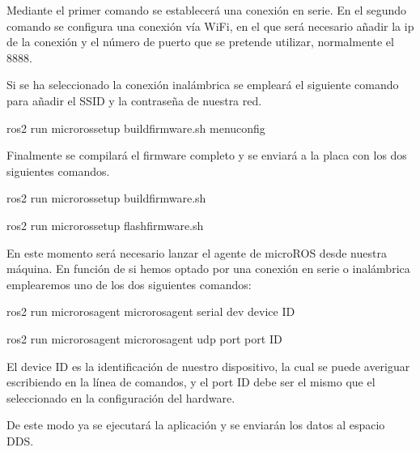 \documentclass[a4paper,11pt,spanish]{sphinxmanual}
\begin{document}
\sphinxAtStartPar
Mediante el primer comando se establecerá una conexión en serie. En el segundo
comando se configura una conexión vía Wi\sphinxhyphen{}Fi, en el que será necesario añadir
la ip de la conexión y el número de puerto que se pretende utilizar, normalmente
el 8888.

\sphinxAtStartPar
Si se ha seleccionado la conexión inalámbrica se empleará el siguiente comando
para añadir el SSID y la contraseña de nuestra red.

\begin{sphinxVerbatim}[commandchars=\\\{\},formatcom=\footnotesize]
ros2 run micro\PYGZus{}ros\PYGZus{}setup build\PYGZus{}firmware.sh menuconfig
\end{sphinxVerbatim}

\sphinxAtStartPar
Finalmente se compilará el firmware completo y se enviará a la placa con los
dos siguientes comandos.

\begin{sphinxVerbatim}[commandchars=\\\{\},formatcom=\footnotesize]
ros2 run micro\PYGZus{}ros\PYGZus{}setup build\PYGZus{}firmware.sh

ros2 run micro\PYGZus{}ros\PYGZus{}setup flash\PYGZus{}firmware.sh
\end{sphinxVerbatim}

\sphinxAtStartPar
En este momento será necesario lanzar el agente de micro\sphinxhyphen{}ROS desde
nuestra máquina. En función de si hemos optado por una conexión en serie
o inalámbrica emplearemos uno de los dos siguientes comandos:

\begin{sphinxVerbatim}[commandchars=\\\{\},formatcom=\footnotesize]
ros2 run micro\PYGZus{}ros\PYGZus{}agent micro\PYGZus{}ros\PYGZus{}agent serial \PYGZhy{}\PYGZhy{}dev \PYG{o}{[}device ID\PYG{o}{]}

ros2 run micro\PYGZus{}ros\PYGZus{}agent micro\PYGZus{}ros\PYGZus{}agent udp \PYGZhy{}\PYGZhy{}port \PYG{o}{[}port ID\PYG{o}{]}
\end{sphinxVerbatim}

\sphinxAtStartPar
El device ID es la identificación de nuestro dispositivo, la cual
se puede averiguar escribiendo  en la línea de
comandos, y el port ID debe ser el mismo que el seleccionado en
la configuración del hardware.

\sphinxAtStartPar
De este modo ya se ejecutará la aplicación y se enviarán los datos
al espacio DDS.
\end{document}
